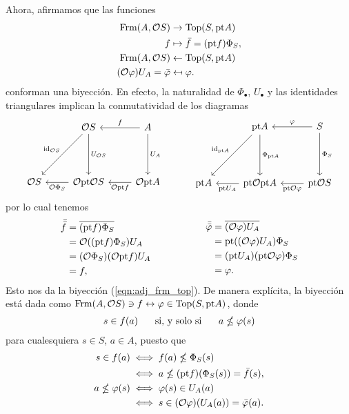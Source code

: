 Ahora, afirmamos que las funciones
\begin{align*}
    \mathrm{Frm}(A,\mathcal{O}S) &\to \mathrm{Top}(S,\mathrm{pt} A) \\
    f &\mapsto \bar f = (\mathrm{pt} f)\Phi_S,
    \\
    \mathrm{Frm}(A,\mathcal{O}S) &\leftarrow \mathrm{Top}(S,\mathrm{pt} A) \\
    (\mathcal{O}\varphi)U_A = \bar{\varphi} &\mapsfrom \varphi.
\end{align*}
conforman una biyección.
En efecto,
la naturalidad de $\Phi_\bullet$, $U_\bullet$ y las identidades
triangulares implican la conmutatividad de los diagramas
\[
    \begin{tikzcd}[row sep=15mm]
        & \cal OS \ar[d,"U_{\cal OS}"] \ar[dl,"\id_{\cal OS}"']
        & A \ar[l,"f"'] \ar[d,"U_A"]
        \\
        \cal OS
        & \cal O\pt\cal OS \ar[l,"\cal O\Phi_S"]
        & \cal O\pt A \ar[l,"\cal O\pt f"]
    \end{tikzcd}
    \hspace{10mm}
    \begin{tikzcd}[row sep=15mm]
        & \pt A \ar[d,"\Phi_{\pt A}"] \ar[dl,"\id_{\pt A}"']
        & S \ar[l,"\phi"'] \ar[d,"\Phi_S"]
        \\
        \pt A
        & \pt \cal O\pt A \ar[l,"\pt U_A"]
        & \pt \cal OS \ar[l,"\pt\cal O\phi"]
    \end{tikzcd}
\]
por lo cual tenemos
\[
    \begin{aligned}
        \bar{\bar f}
        &= \ol{(\pt f)\Phi_S} \\
        &= \cal O((\pt f)\Phi_S)U_A \\
        &= (\cal O\Phi_S)(\cal O\pt f)U_A \\
        &= f,
    \end{aligned}
    \hspace{20mm}
    \begin{aligned}
        \bar{\bar\phi}
        &= \ol{(\cal O\phi)U_A} \\
        &= \pt((\cal O\phi)U_A)\Phi_S \\
        &= (\pt U_A)(\pt\cal O\phi)\Phi_S \\
        &= \phi.
    \end{aligned}
\]
Esto nos da la biyección (\ref{eqn:adj_frm_top}).
De manera explícita, la biyección está dada como
$\mathrm{Frm}(A,\mathcal{O}S)\ni f\leftrightarrow \varphi\in \mathrm{Top}(S,\mathrm{pt} A)$, donde
\[
    s\in f(a) \hspace{5mm}\text{ si, y solo si }\hspace{5mm} a\nleq \varphi(s)
\]
para cualesquiera $s\in S$, $a\in A$, puesto que
\begin{align*}
    s\in f(a)
    &\iff f(a)\nleq \Phi_S(s) \\
    &\iff a \nleq (\mathrm{pt} f)(\Phi_S(s))=\bar f(s),
    \\
    a\nleq \varphi(s)
    &\iff \varphi(s) \in U_A(a) \\
    &\iff s \in (\mathcal{O}\varphi)(U_A(a)) = \bar{\varphi}(a).
\end{align*}

